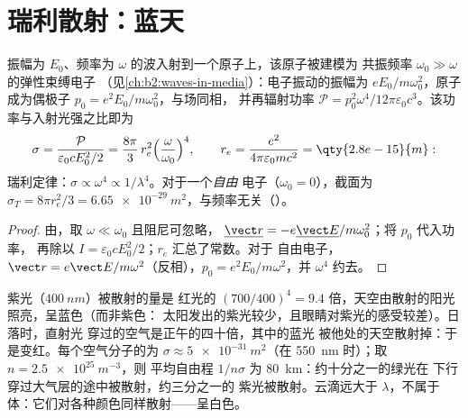 \section{瑞利散射：蓝天}

\begin{proposition}[束缚电子的散射]\label{prop:b2:dipole-radiation:rayleigh}
振幅为 $E_0$、频率为 $\omega$ 的波入射到一个原子上，该原子被建模为
共振频率 $\omega_0 \gg \omega$ 的弹性束缚电子
（见\cref{ch:b2:waves-in-media}）：电子振动的振幅为
$eE_0/m\omega_0^2$，原子成为偶极子 $p_0 = e^2E_0/m\omega_0^2$，与场同相，
并再辐射功率 $\mathcal P = p_0^2\omega^4/12\pi
\varepsilon_0c^3$。该功率与入射光强之比即为
\emph{}
\[
\sigma = \frac{\mathcal P}{\varepsilon_0cE_0^2/2} = \frac{8\pi}3\,r_e^2\Bigl(\frac\omega{\omega_0}\Bigr)^4 ,
\qquad r_e = \frac{e^2}{4\pi\varepsilon_0mc^2} = \qty{2.8e-15}{m} :
\]
瑞利定律：$\sigma \propto \omega^4 \propto 1/\lambda^4$。对于一个\emph{自由}
电子（$\omega_0 = 0$），截面为 $\sigma_T = 8\pi r_e^2/3 =
\qty{6.65e-29}{m^2}$，与频率无关（）。
\end{proposition}

\begin{proof}
由，取 $\omega \ll \omega_0$ 且阻尼可忽略，
$\underline{\vect r} = -e\underline{\vect E}/m\omega_0^2$；将 $p_0$ 代入功率，
再除以 $I = \varepsilon_0cE_0^2/2$；$r_e$ 汇总了常数。对于
自由电子，$\vect r = e\vect E/m\omega^2$（反相），$p_0 = e^2E_0/m\omega^2$，并
$\omega^4$ 约去。
\end{proof}

\begin{example}[蓝天、红色日落、白云]\label{ex:b2:dipole-radiation:sky}
紫光（$\qty{400}{nm}$）被散射的量是
红光的 $(700/400)^4 = 9.4$ 倍，天空由散射的阳光照亮，呈蓝色（而非紫色：
太阳发出的紫光较少，且眼睛对紫光的感受较差）。日落时，直射光
穿过的空气是正午的四十倍，其中的蓝光
被他处的天空散射掉：于是变红。每个空气分子的为 $\sigma \approx \qty{5e-31}{m^2}$（在 \qty{550}{nm} 时）；取 $n = \qty{2.5e25}{m^{-3}}$，则
平均自由程 $1/n\sigma$ 为 \qty{80}{km}：约十分之一的绿光在
下行穿过大气层的途中被散射，约三分之一的
紫光被散射。云滴远大于 $\lambda$，不属于
体：它们对各种颜色同样散射——呈白色。
\end{example}

